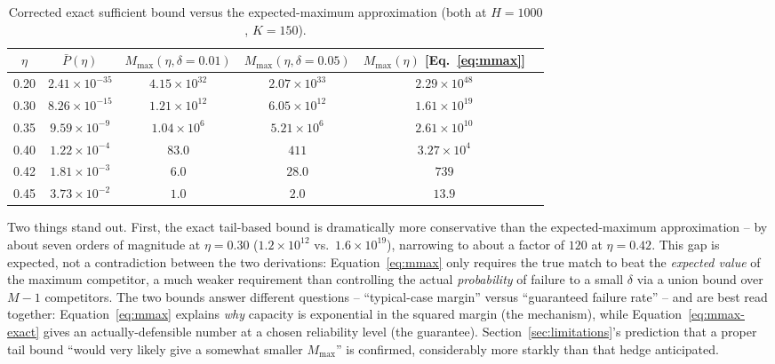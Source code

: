 \documentclass[11pt]{article}
\newcommand{\toprule}{\hline\hline}
\newcommand{\midrule}{\hline}
\newcommand{\bottomrule}{\hline\hline}
\begin{document}
\begin{table}[h]
\centering
\begin{tabular}{cccccc}
\toprule
$\eta$ & $\bar P(\eta)$ & $M_{\max}(\eta,\delta{=}0.01)$ & $M_{\max}(\eta,\delta{=}0.05)$ & $M_{\max}(\eta)$ [Eq.~\ref{eq:mmax}] \\
\midrule
0.20 & $2.41\times10^{-35}$ & $4.15\times10^{32}$ & $2.07\times10^{33}$ & $2.29\times10^{48}$ \\
0.30 & $8.26\times10^{-15}$ & $1.21\times10^{12}$ & $6.05\times10^{12}$ & $1.61\times10^{19}$ \\
0.35 & $9.59\times10^{-9}$  & $1.04\times10^{6}$  & $5.21\times10^{6}$  & $2.61\times10^{10}$ \\
0.40 & $1.22\times10^{-4}$  & $83.0$              & $411$               & $3.27\times10^{4}$ \\
0.42 & $1.81\times10^{-3}$  & $6.0$               & $28.0$              & $739$ \\
0.45 & $3.73\times10^{-2}$  & $1.0$               & $2.0$               & $13.9$ \\
\bottomrule
\end{tabular}
\caption{Corrected exact sufficient bound versus the expected-maximum approximation
(both at $H=1000$, $K=150$).}
\label{tab:exacttail}
\end{table}

Two things stand out. First, the exact tail-based bound is dramatically more conservative than
the expected-maximum approximation -- by about seven orders of magnitude at $\eta=0.30$
($1.2\times10^{12}$ vs.\ $1.6\times10^{19}$), narrowing to about a factor of $120$ at
$\eta=0.42$. This gap is expected, not a contradiction between the two derivations: Equation~\ref{eq:mmax}
only requires the true match to beat the \emph{expected value} of the maximum competitor, a much
weaker requirement than controlling the actual \emph{probability} of failure to a small $\delta$
via a union bound over $M-1$ competitors. The two bounds answer different questions --
``typical-case margin'' versus ``guaranteed failure rate'' -- and are best read together:
Equation~\ref{eq:mmax} explains \emph{why} capacity is exponential in the squared margin (the
mechanism), while Equation~\ref{eq:mmax-exact} gives an actually-defensible number at a chosen
reliability level (the guarantee). Section~\ref{sec:limitations}'s prediction that a proper tail
bound ``would very likely give a somewhat smaller $M_{\max}$'' is confirmed, considerably more
starkly than that hedge anticipated.
\end{document}
